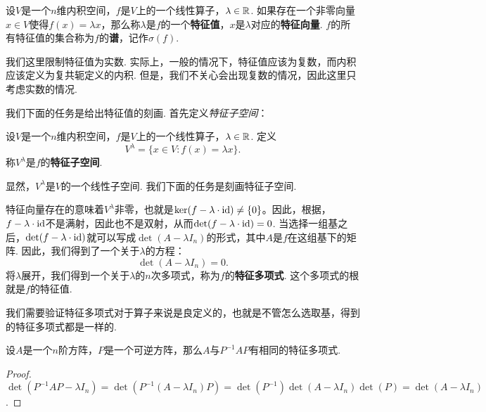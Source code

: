\begin{definition}
设$V$是一个$n$维内积空间，$f$是$V$上的一个线性算子，$\lambda\in\mathbb{R}$. 如果存在一个非零向量$x\in V$使得$f(x)=\lambda x$，那么称$\lambda$是$f$的一个\textbf{特征值}，$x$是$\lambda$对应的\textbf{特征向量}. $f$的所有特征值的集合称为$f$的\textbf{谱}，记作$\sigma(f)$. 
\end{definition}

我们这里限制特征值为实数. 实际上，一般的情况下，特征值应该为复数，而内积应该定义为复共轭定义的内积. 但是，我们不关心会出现复数的情况，因此这里只考虑实数的情况. 

我们下面的任务是给出特征值的刻画. 首先定义\emph{特征子空间}：

\begin{definition}[特征子空间]
设$V$是一个$n$维内积空间，$f$是$V$上的一个线性算子，$\lambda\in\mathbb{R}$. 定义
\[V^\lambda=\{x\in V:f(x)=\lambda x\}.\]
称$V^\lambda$是$f$的\textbf{特征子空间}. 
\end{definition}

显然，$V^\lambda$是$V$的一个线性子空间. 我们下面的任务是刻画特征子空间. 

特征向量存在的意味着$V^\lambda$非零，也就是$\ker(f-\lambda\cdot \mathrm{id})\neq\{0\}$。因此，根据，$f-\lambda\cdot \mathrm{id}$不是满射，因此也不是双射，从而$\det(f-\lambda\cdot \mathrm{id})=0$. 当选择一组基之后，$\det(f-\lambda\cdot \mathrm{id})$就可以写成$\det(A-\lambda I_n)$的形式，其中$A$是$f$在这组基下的矩阵. 因此，我们得到了一个关于$\lambda$的方程：
\begin{equation}\label{eq:characteristic-equation}
    \det(A-\lambda I_n)=0.
\end{equation}
将$\lambda$展开，我们得到一个关于$\lambda$的$n$次多项式，称为$f$的\textbf{特征多项式}. 这个多项式的根就是$f$的特征值. 

我们需要验证特征多项式对于算子来说是良定义的，也就是不管怎么选取基，得到的特征多项式都是一样的.

\begin{proposition}\label{prop:similar-matrix-same-characteristic-polynomial}
    设$A$是一个$n$阶方阵，$P$是一个可逆方阵，那么$A$与$P^{-1}AP$有相同的特征多项式. 
\end{proposition}
\begin{proof}
    $\det(P^{-1}AP-\lambda I_n)=\det(P^{-1}(A-\lambda I_n)P)=\det(P^{-1})\det(A-\lambda I_n)\det(P)=\det(A-\lambda I_n)$.
\end{proof}


